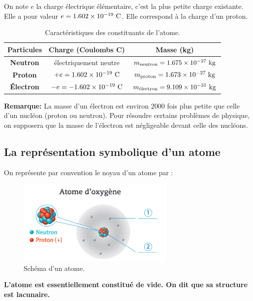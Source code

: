 \documentclass[french]{article}
\begin{document}
On note $e$ la charge électrique élémentaire, c'est la plus petite charge existante. Elle a pour valeur $e =1.602\times 10^{-19}~\rm C$. Elle correspond à la charge d'un proton.
\begin{table}[ht]
	\centering
	\begin{tabular}{|c|c|c|}
		\hline
		\textbf{Particules} & \textbf{Charge (Coulombs C)} & \textbf{Masse (kg)} \\ \hline 
		\textbf{Neutron} & électriquement neutre & $m_{\rm neutron} = 1.675\times 10^{-27}~\rm kg$ \\ \hline
		\textbf{Proton} & $+ e = 1.602\times 10^{-19}~\rm C$& $m_{\rm proton} = 1.673\times 10^{-27}~\rm kg$ \\ \hline
		\textbf{Électron} & $-e = -1.602\times 10^{-19}~\rm C$ & $m_{\rm \text{électron}} = 9.109\times 10^{-31}~\rm kg$\\ \hline
	\end{tabular}
	\caption{Caractéristiques des constituants de l'atome.}
\end{table}

\textbf{Remarque:} La masse d'un électron est environ 2000 fois plus petite que celle d'un nucléon (proton ou neutron). Pour résoudre certains problèmes de physique, on supposera que la masse de l'électron est négligeable devant celle des nucléons.


\subsection{La représentation symbolique d'un atome} 
On représente par convention le noyau d'un atome par :\medskip

\begin{figure}[ht]
	\centering
	\includegraphics[width=.5\textwidth]{SchemaAtome.png}
	\caption{Schéma d'un atome.}
\end{figure}

\textbf{L'atome est essentiellement constitué de vide. On dit que sa structure est lacunaire.}\medskip
\end{document}
